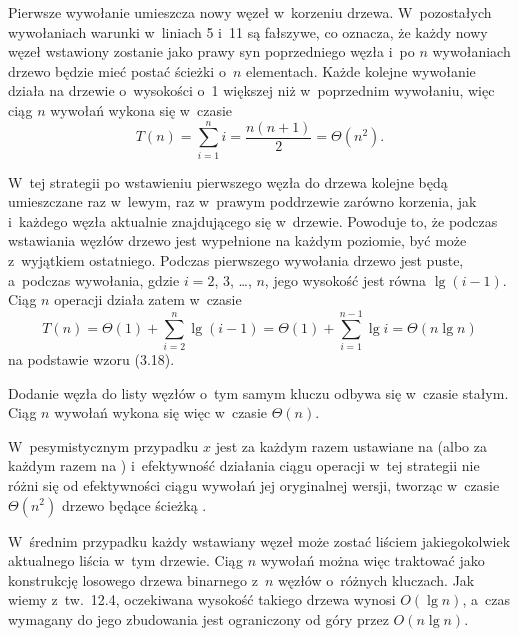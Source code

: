 \exercise %

\problems


\subproblem %
Pierwsze wywołanie  umieszcza nowy węzeł w~korzeniu drzewa.
W~pozostałych wywołaniach warunki w~liniach 5 i~11 są fałszywe, co oznacza, że każdy nowy węzeł wstawiony zostanie jako prawy syn poprzedniego węzła i~po $n$ wywołaniach  drzewo będzie mieć postać ścieżki o~$n$ elementach.
Każde kolejne wywołanie działa na drzewie o~wysokości o~1 większej niż w~poprzednim wywołaniu, więc ciąg $n$ wywołań wykona się w~czasie
\[
	T(n) = \sum_{i=1}^ni = \frac{n(n+1)}{2} = \Theta(n^2).
\]

\subproblem %
W~tej strategii po wstawieniu pierwszego węzła do drzewa kolejne będą umieszczane raz w~lewym, raz w~prawym poddrzewie zarówno korzenia, jak i~każdego węzła aktualnie znajdującego się w~drzewie.
Powoduje to, że podczas wstawiania węzłów drzewo jest wypełnione na każdym poziomie, być może z~wyjątkiem ostatniego.
Podczas pierwszego wywołania  drzewo jest puste, a~podczas  wywołania, gdzie $i=2$, 3, \dots, $n$, jego wysokość jest równa $\lg(i-1)$.
Ciąg $n$ operacji  działa zatem w~czasie
\[
	T(n) = \Theta(1)+\sum_{i=2}^n\lg(i-1) = \Theta(1)+\sum_{i=1}^{n-1}\lg i = \Theta(n\lg n)
\]
na podstawie wzoru (3.18).

\subproblem %
Dodanie węzła do listy węzłów o~tym samym kluczu odbywa się w~czasie stałym.
Ciąg $n$ wywołań  wykona się więc w~czasie $\Theta(n)$.

\subproblem %
W~pesymistycznym przypadku $x$ jest za każdym razem ustawiane na  (albo za każdym razem na ) i~efektywność działania ciągu operacji  w~tej strategii nie różni się od efektywności ciągu wywołań jej oryginalnej wersji, tworząc w~czasie $\Theta(n^2)$ drzewo będące ścieżką .

W~średnim przypadku każdy wstawiany węzeł może zostać liściem jakiegokolwiek aktualnego liścia w~tym drzewie.
Ciąg $n$ wywołań  można więc traktować jako konstrukcję losowego drzewa binarnego z~$n$ węzłów o~różnych kluczach.
Jak wiemy z~tw.\ 12.4, oczekiwana wysokość takiego drzewa wynosi $O(\lg n)$, a~czas wymagany do jego zbudowania jest ograniczony od góry przez $O(n\lg n)$.

